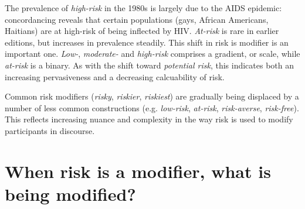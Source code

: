 The prevalence of \emph{high-risk} in the 1980s is largely due to the AIDS epidemic: concordancing reveals that certain populations (gays, African Americans, Haitians) are at high-risk of being inflected by HIV. \emph{At-risk} is rare in earlier editions, but increases in prevalence steadily. This shift in risk is modifier is an important one. \emph{Low-}, \emph{moderate-} and \emph{high-risk} comprises a gradient, or scale, while \emph{at-risk} is a binary. As with the shift toward \emph{potential risk}, this indicates both an increasing pervasiveness and a decreasing calcuability of risk. %





\vspace{5mm}\noindent\begin{tcolorbox}[colback=yellow!5,colframe=yellow!40!black,title=Summary: frequencies of modifier risk]
\parbox{1\textwidth}{%
Common risk modifiers (\emph{risky}, \emph{riskier}, \emph{riskiest}) are gradually being displaced by a number of less common constructions (e.g. \emph{low-risk}, \emph{at-risk}, \emph{risk-averse}, \emph{risk-free}). This reflects increasing nuance and complexity in the way risk is used to modify participants in discourse.}
\end{tcolorbox}
\vspace{5mm}

\section{When risk is a modifier, what is being modified?} \label{sect:mod_two} \FloatBarrier 

